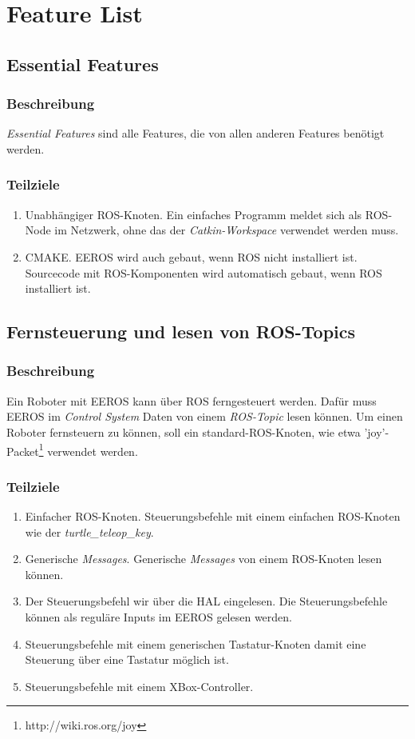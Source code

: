 \chapter{Feature List}


\section{Essential Features}
\subsection{Beschreibung}
\textit{Essential Features} sind alle Features, die von allen anderen Features benötigt werden.

\subsection{Teilziele}
\begin{enumerate}
\item Unabhängiger ROS-Knoten. Ein einfaches Programm meldet sich als ROS-Node im Netzwerk, ohne das der \textit{Catkin-Workspace} verwendet werden muss.
\item CMAKE. EEROS wird auch gebaut, wenn ROS nicht installiert ist. Sourcecode mit ROS-Komponenten wird automatisch gebaut, wenn ROS installiert ist.
\end{enumerate}


\section{Fernsteuerung und lesen von ROS-Topics}
\subsection{Beschreibung}
Ein Roboter mit EEROS kann über ROS ferngesteuert werden.
Dafür muss EEROS im \textit{Control System} Daten von einem \textit{ROS-Topic} lesen können.
Um einen Roboter fernsteuern zu können, soll ein standard-ROS-Knoten, wie etwa 'joy'-Packet\footnote{http://wiki.ros.org/joy} verwendet werden.

\subsection{Teilziele}
\begin{enumerate}
\item Einfacher ROS-Knoten. Steuerungsbefehle mit einem einfachen ROS-Knoten wie der \textit{turtle\_teleop\_key}.
\item Generische \textit{Messages}. Generische \textit{Messages} von einem ROS-Knoten lesen können.
\item Der Steuerungsbefehl wir über die HAL eingelesen. Die Steuerungsbefehle können als reguläre Inputs im EEROS gelesen werden.
\item Steuerungsbefehle mit einem generischen Tastatur-Knoten damit eine Steuerung über eine Tastatur möglich ist.
\item Steuerungsbefehle mit einem XBox-Controller.
\end{enumerate}


